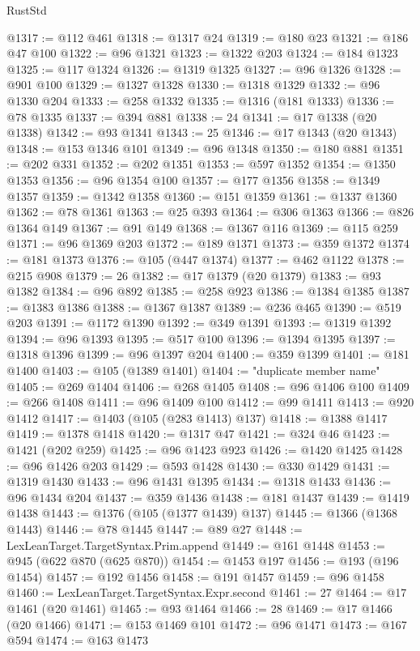\begin{lexlean}{RustStd}
\begin{coremodule}
@1317 := @112 @461
@1318 := @1317 @24
@1319 := @180 @23
@1321 := @186 @47 @100
@1322 := @96 @1321
@1323 := @1322 @203
@1324 := @184 @1323
@1325 := @117 @1324
@1326 := @1319 @1325
@1327 := @96 @1326
@1328 := @901 @100
@1329 := @1327 @1328
@1330 := @1318 @1329
@1332 := @96 @1330 @204
@1333 := @258 @1332
@1335 := @1316 (@181 @1333)
@1336 := @78 @1335
@1337 := @394 @881
@1338 := 24
@1341 := @17 @1338 (@20 @1338)
@1342 := @93 @1341
@1343 := 25
@1346 := @17 @1343 (@20 @1343)
@1348 := @153 @1346 @101
@1349 := @96 @1348
@1350 := @180 @881
@1351 := @202 @331
@1352 := @202 @1351
@1353 := @597 @1352
@1354 := @1350 @1353
@1356 := @96 @1354 @100
@1357 := @177 @1356
@1358 := @1349 @1357
@1359 := @1342 @1358
@1360 := @151 @1359
@1361 := @1337 @1360
@1362 := @78 @1361
@1363 := @25 @393
@1364 := @306 @1363
@1366 := @826 @1364 @149
@1367 := @91 @149
@1368 := @1367 @116
@1369 := @115 @259
@1371 := @96 @1369 @203
@1372 := @189 @1371
@1373 := @359 @1372
@1374 := @181 @1373
@1376 := @105 (@447 @1374)
@1377 := @462 @1122
@1378 := @215 @908
@1379 := 26
@1382 := @17 @1379 (@20 @1379)
@1383 := @93 @1382
@1384 := @96 @892
@1385 := @258 @923
@1386 := @1384 @1385
@1387 := @1383 @1386
@1388 := @1367 @1387
@1389 := @236 @465
@1390 := @519 @203
@1391 := @1172 @1390
@1392 := @349 @1391
@1393 := @1319 @1392
@1394 := @96 @1393
@1395 := @517 @100
@1396 := @1394 @1395
@1397 := @1318 @1396
@1399 := @96 @1397 @204
@1400 := @359 @1399
@1401 := @181 @1400
@1403 := @105 (@1389 @1401)
@1404 := "duplicate member name"
@1405 := @269 @1404
@1406 := @268 @1405
@1408 := @96 @1406 @100
@1409 := @266 @1408
@1411 := @96 @1409 @100
@1412 := @99 @1411
@1413 := @920 @1412
@1417 := @1403 (@105 (@283 @1413) @137)
@1418 := @1388 @1417
@1419 := @1378 @1418
@1420 := @1317 @47
@1421 := @324 @46
@1423 := @1421 (@202 @259)
@1425 := @96 @1423 @923
@1426 := @1420 @1425
@1428 := @96 @1426 @203
@1429 := @593 @1428
@1430 := @330 @1429
@1431 := @1319 @1430
@1433 := @96 @1431 @1395
@1434 := @1318 @1433
@1436 := @96 @1434 @204
@1437 := @359 @1436
@1438 := @181 @1437
@1439 := @1419 @1438
@1443 := @1376 (@105 (@1377 @1439) @137)
@1445 := @1366 (@1368 @1443)
@1446 := @78 @1445
@1447 := @89 @27
@1448 := LexLeanTarget.TargetSyntax.Prim.append
@1449 := @161 @1448
@1453 := @945 (@622 @870 (@625 @870))
@1454 := @1453 @197
@1456 := @193 (@196 @1454)
@1457 := @192 @1456
@1458 := @191 @1457
@1459 := @96 @1458
@1460 := LexLeanTarget.TargetSyntax.Expr.second
@1461 := 27
@1464 := @17 @1461 (@20 @1461)
@1465 := @93 @1464
@1466 := 28
@1469 := @17 @1466 (@20 @1466)
@1471 := @153 @1469 @101
@1472 := @96 @1471
@1473 := @167 @594
@1474 := @163 @1473

\end{coremodule}
\end{lexlean}
